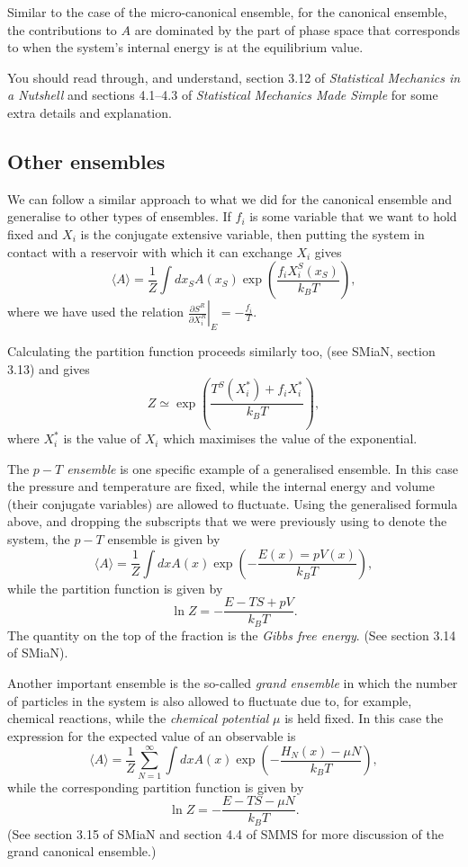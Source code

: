 \documentclass{article}
\begin{document}
Similar to the case of the micro-canonical ensemble, for the canonical ensemble, the contributions to $A$ are dominated by the part of phase space that corresponds to when the system's internal energy is at the equilibrium value. 

You should read through, and understand, section 3.12 of \emph{Statistical Mechanics in a Nutshell} and sections 4.1--4.3 of \emph{Statistical Mechanics Made Simple} for some extra details and explanation.

\subsection*{Other ensembles}
We can follow a similar approach to what we did for the canonical ensemble and generalise to other types of ensembles. If $f_i$ is some variable that we want to hold fixed and $X_i$ is the conjugate extensive variable, then putting the system in contact with a reservoir with which it can exchange $X_i$ gives
\begin{equation*}
	\langle A\rangle = \frac{1}{Z}\int dx_SA(x_S)\exp\left(\frac{f_iX^S_i(x_S)}{k_BT}\right),
\end{equation*}
where we have used the relation $\left.\frac{\partial S^R}{\partial X_i^R}\right|_E=-\frac{f_i}{T}$.

Calculating the partition function proceeds similarly too, (see SMiaN, section 3.13) and gives
\begin{equation*}
	Z \simeq \exp\left(\frac{T^S(X_i^*)+f_iX_i^*}{k_BT}\right),
\end{equation*}
where $X_i^*$ is the value of $X_i$ which maximises the value of the exponential.

The \emph{$p-T$ ensemble} is one specific example of a generalised ensemble. In this case the pressure and temperature are fixed, while the internal energy and volume (their conjugate variables) are allowed to fluctuate.
Using the generalised formula above, and dropping the subscripts that we were previously using to denote the system, the $p-T$ ensemble is given by
 \begin{equation*}
	\langle A\rangle = \frac{1}{Z}\int dxA(x)\exp\left(-\frac{E(x)=pV(x)}{k_BT}\right),
\end{equation*}
while the partition function is given by
$$
	\ln Z = -\frac{E-TS+pV}{k_BT}.
$$
The quantity on the top of the fraction is the \emph{Gibbs free energy}. (See section 3.14 of SMiaN).

Another important ensemble is the so-called \emph{grand ensemble} in which the number of particles in the system is also allowed to fluctuate due to, for example, chemical reactions, while the \emph{chemical potential} $\mu$ is held fixed. In this case the expression for the expected value of an observable is
$$
	\langle A \rangle = \frac{1}{Z} \sum_{N=1}^\infty \int dxA(x)\exp\left(-\frac{H_N(x)-\mu N}{k_BT}\right),
$$
while the corresponding partition function is given by
$$
	\ln Z = -\frac{E-TS-\mu N}{k_BT}.
$$
(See section 3.15 of SMiaN and section 4.4 of SMMS for more discussion of the grand canonical ensemble.)
\end{document}
